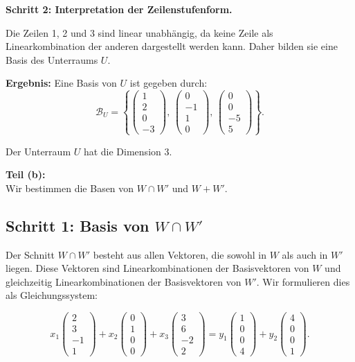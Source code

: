 \documentclass[11pt]{article}
\begin{document}
\textbf{Schritt 2: Interpretation der Zeilenstufenform.}

Die Zeilen 1, 2 und 3 sind linear unabhängig, da keine Zeile als Linearkombination der anderen dargestellt werden kann. Daher bilden sie eine Basis des Unterraums \( U \).

\textbf{Ergebnis:} Eine Basis von \( U \) ist gegeben durch:
\[
\mathcal{B}_U = \left\{
\begin{pmatrix} 1 \\ 2 \\ 0 \\ -3 \end{pmatrix}, \,
\begin{pmatrix} 0 \\ -1 \\ 1 \\ 0 \end{pmatrix}, \,
\begin{pmatrix} 0 \\ 0 \\ -5 \\ 5 \end{pmatrix}
\right\}.
\]

Der Unterraum \( U \) hat die Dimension \( 3 \).

\textbf{Teil (b):} \\
Wir bestimmen die Basen von \( W \cap W' \) und \( W + W' \).

\subsection*{Schritt 1: Basis von \( W \cap W' \)}

Der Schnitt \( W \cap W' \) besteht aus allen Vektoren, die sowohl in \( W \) als auch in \( W' \) liegen. Diese Vektoren sind Linearkombinationen der Basisvektoren von \( W \) und gleichzeitig Linearkombinationen der Basisvektoren von \( W' \). Wir formulieren dies als Gleichungssystem:

\[
x_1 \begin{pmatrix} 2 \\ 3 \\ -1 \\ 1 \end{pmatrix} + x_2 \begin{pmatrix} 0 \\ 1 \\ 0 \\ 0 \end{pmatrix} + x_3 \begin{pmatrix} 3 \\ 6 \\ -2 \\ 2 \end{pmatrix}
= y_1 \begin{pmatrix} 1 \\ 0 \\ 0 \\ 4 \end{pmatrix} + y_2 \begin{pmatrix} 4 \\ 0 \\ 0 \\ 1 \end{pmatrix}.
\]
\end{document}
